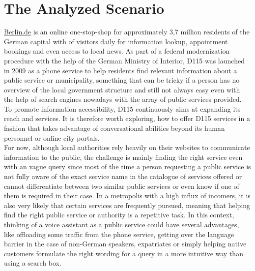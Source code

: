 \section{The Analyzed Scenario}
\href{https://www.berlin.de}{Berlin.de} is an online one-stop-shop for approximately 3,7 million residents of the German capital\cite{zensus} with  of visitors daily for information lookup, appointment bookings and even access to local news. As part of a federal modernization procedure with the help of the German Ministry of Interior, D115 was launched in 2009 \cite{d115} as a phone service to help residents find relevant information about a public service or municipality, something that can be tricky if a person has no overview of the local government structure and still not always easy even with the help of search engines nowadays with the array of public services provided.
To promote information accessibility, D115 continuously aims at expanding its reach and services.
It is therefore worth exploring, how to offer D115 services in a fashion that takes advantage of conversational abilities beyond its human personnel or online city portals. 
\\

For now, although local authorities rely heavily on their websites to communicate information to the public, the challenge is mainly finding the right service even with an vague query since most of the time a person requesting a public service is not fully aware of the exact service name in the catalogue of services offered or cannot differentiate between two similar public services or even know if one of them is required in their case.
In a metropolis with a high influx of incomers, it is also very likely that certain services are frequently pursued, meaning that helping find the right public service or authority is a repetitive task. In this context, thinking of a voice assistant as a public service could have several advantages, like offloading some traffic from the phone service, getting over the language barrier in the case of non-German speakers, expatriates or simply helping native customers formulate the right wording for a query in a more intuitive way than using a search box. 

